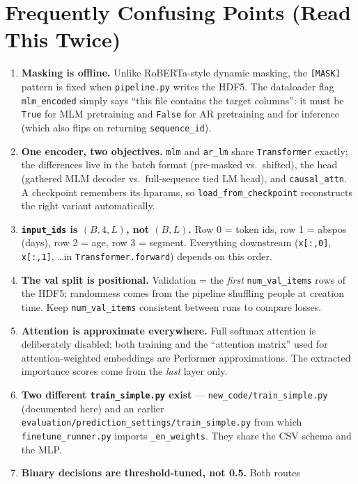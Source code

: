 \documentclass[11pt,a4paper]{article}
\newcommand{\file}[1]{\texttt{\small #1}}
\newcommand{\code}[1]{\texttt{\small #1}}
\begin{document}
\section{Frequently Confusing Points (Read This Twice)}
\begin{enumerate}[itemsep=2pt]
  \item \textbf{Masking is offline.} Unlike RoBERTa-style dynamic masking, the
    \code{[MASK]} pattern is fixed when \file{pipeline.py} writes the HDF5. The
    dataloader flag \code{mlm\_encoded} simply says ``this file contains the
    target columns'': it must be \code{True} for MLM pretraining and
    \code{False} for AR pretraining and for inference (which also flips on
    returning \code{sequence\_id}).
  \item \textbf{One encoder, two objectives.} \code{mlm} and \code{ar\_lm}
    share \code{Transformer} exactly; the differences live in the batch format
    (pre-masked vs.\ shifted), the head (gathered MLM decoder vs.\ full-sequence
    tied LM head), and \code{causal\_attn}. A checkpoint remembers its hparams,
    so \code{load\_from\_checkpoint} reconstructs the right variant
    automatically.
  \item \textbf{\code{input\_ids} is $(B,4,L)$, not $(B,L)$.} Row 0 = token ids,
    row 1 = abspos (days), row 2 = age, row 3 = segment. Everything downstream
    (\code{x[:,0]}, \code{x[:,1]}, \dots in \code{Transformer.forward}) depends
    on this order.
  \item \textbf{The val split is positional.} Validation = the \emph{first}
    \code{num\_val\_items} rows of the HDF5; randomness comes from the pipeline
    shuffling people at creation time. Keep \code{num\_val\_items} consistent
    between runs to compare losses.
  \item \textbf{Attention is approximate everywhere.} Full softmax attention is
    deliberately disabled; both training and the ``attention matrix'' used for
    attention-weighted embeddings are Performer approximations. The extracted
    importance scores come from the \emph{last} layer only.
  \item \textbf{Two different \code{train\_simple.py} exist} ---
    \code{new\_code/train\_simple.py} (documented here) and an earlier
    \code{evaluation/prediction\_settings/train\_simple.py} from which
    \code{finetune\_runner.py} imports \code{\_en\_weights}. They share the CSV
    schema and the MLP.
  \item \textbf{Binary decisions are threshold-tuned, not 0.5.} Both routes

\end{enumerate}
\end{document}

